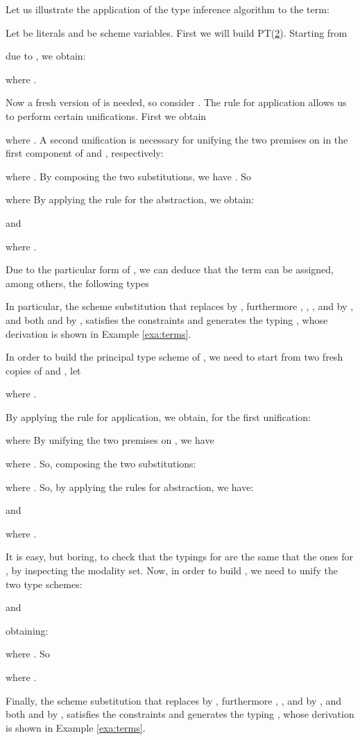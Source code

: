 \begin{exa}
  Let us illustrate the application of the type inference algorithm to
  the term:
 
  Let  be literals and  be scheme variables.  First we will
  build PT(\underline{2}). Starting from

  due to , we obtain:
 
  where .

  Now a fresh version of  is needed, so consider .  The rule for application allows
  us to perform certain unifications.  First we obtain
 
  where .  A second unification is
  necessary for unifying the two premises on  in the first
  component of  and , respectively:
 
  where .  By composing the two substitutions,
  we have .  So 

  where  By
  applying the rule for the abstraction, we obtain:

  and

  where .

  Due to the particular form of , we can deduce
  that the term  can be assigned, among others,
  the following types

  In particular, the scheme substitution that replaces  by , furthermore , , ,  and  by , and both
   and  by , satisfies the constraints and generates the
  typing , whose derivation is
  shown in Example \ref{exa:terms}.

  In order to build the principal type scheme of , we
  need to start from two fresh copies of  and , let

  where .

  By applying the rule for application, we obtain, for the first
  unification:

  where  By unifying the two premises on , we have
 
  where . So, composing the two substitutions:

  where .
  So, by applying the rules for abstraction, we have:

  and

  where .

  It is easy, but boring, to check that the typings for
   are the same that the ones for , by
  inspecting the modality set.  Now, in order to build
  , we need to unify the two
  type schemes:

  and 
 
  obtaining:

  where . So

  where .

  Finally, the scheme substitution that replaces  by ,
  furthermore , ,  and  by , and both  and
   by , satisfies the constraints and generates the typing
  , whose derivation is
  shown in Example \ref{exa:terms}.
\end{exa}

